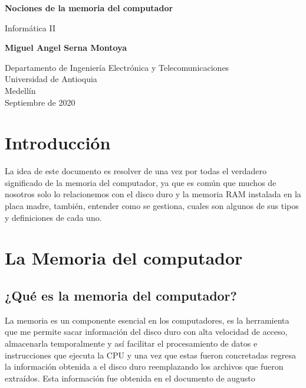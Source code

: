 \documentclass{article}
\begin{document}
\begin{titlepage}
    \begin{center}
        \vspace*{1cm}
            
        \Huge
        \textbf{Nociones de la memoria del computador}
            
        \vspace{0.5cm}
        \LARGE
        Informática II
            
        \vspace{1.5cm}
            
        \textbf{Miguel Angel Serna Montoya}
            
        \vfill
            
        \vspace{0.8cm}
            
        \Large
        Departamento de Ingeniería Electrónica y Telecomunicaciones\\
        Universidad de Antioquia\\
        Medellín\\
        Septiembre de 2020
            
    \end{center}
\end{titlepage}

\tableofcontents
\newpage
\section{Introducción} \label{Introducción}
La idea de este documento es resolver de una vez por todas el verdadero significado de la memoria del computador, ya que es común que muchos de nosotros solo lo relacionemos con el disco duro y la memoria RAM instalada en la placa madre, también, entender como se gestiona, cuales son algunos de sus tipos y definiciones de cada uno.

\section{La Memoria del computador}
\subsection{¿Qué es la memoria del computador?}
La memoria es un componente esencial en los computadores, es la herramienta que me permite sacar información del disco duro con alta velocidad de acceso, almacenarla temporalmente y así facilitar el procesamiento de datos e instrucciones que ejecuta la CPU y una vez que estas fueron concretadas regresa la información obtenida a el disco duro reemplazando los archivos que fueron extraídos. Esta información fue obtenida en el documento de augusto \cite{Referencia}
\end{document}
